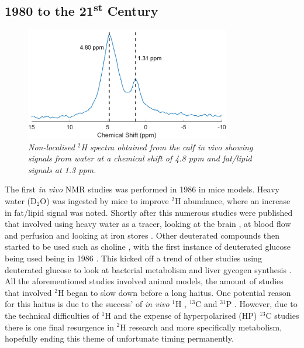 \documentclass[class=article, crop=false]{standalone}
\begin{document}
\subsection{1980 to the 21\textsuperscript{st} Century}


\begin{figure}
    \centering
    \includegraphics[width=0.8\textwidth]{Figures/Intro/NA_Spectra.png}
    \caption{\textit{Non-localised $^2$H spectra obtained from the calf \textit{in vivo} showing signals from water at a chemical shift of 4.8 ppm and fat/lipid signals at 1.3 ppm.}}
    \label{fig:intro:NA}
\end{figure}

The first \textit{in vivo} NMR studies was performed in 1986 \cite{Brereton1986PreliminarySpectroscopy} in mice models. Heavy water (D$_2$O) was ingested by mice to improve $^2$H abundance, where an increase in fat/lipid signal was noted. Shortly after this numerous studies were published that involved using heavy water as a tracer, looking at the brain \cite{Ewy1988DeuteriumSitu}, at blood flow and perfusion \cite{Ackerman1987DeuteriumTracer.} and looking at iron stores \cite{Irving1987InSpectroscopy}. Other deuterated compounds then started to be used such as choline \cite{Eng1990RenalStudy}, with the first instance of deuterated glucose being used being in 1986 \cite{Barrow1986NMRMobilis}. This kicked off a trend of other studies using deuterated glucose to look at bacterial metabolism \cite{Aguayo1988HighMetabolism.} and liver gycogen synthesis \cite{Goodman1989UseSynthesis}. All the aforementioned studies involved animal models, the amount of studies that involved $^2$H began to slow down before a long haitus. One potential reason for this haitus is due to the success' of \textit{in vivo} $^1$H \cite{Harada1984IdentificationScience}, $^{13}$C \cite{Cohen1980UseLiver} and $^{31}$P \cite{Sappey-Marinier1992EffectSpectroscopy}. However, due to the technical difficulties of $^1$H and the expense of hyperpolarised (HP) $^{13}$C studies there is one final resurgence in $^2$H research and more specifically metabolism, hopefully ending this theme of unfortunate timing permanently. 
\end{document}
